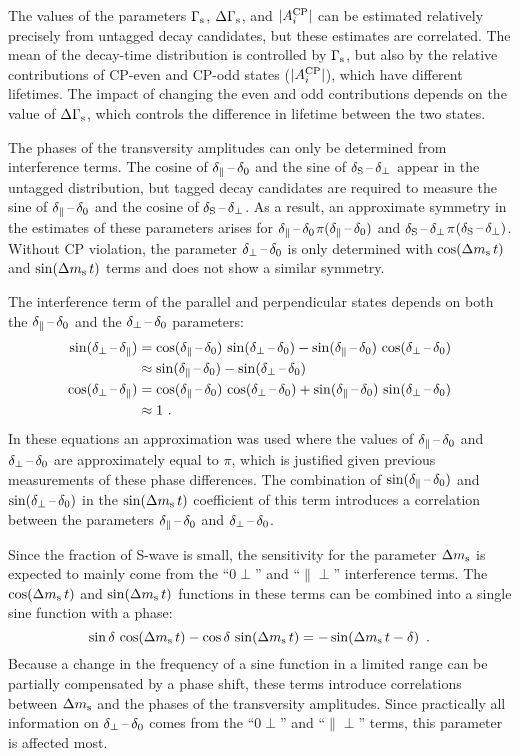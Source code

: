 The values of the parameters $\Gamma_\text{s}$, $\Delta\Gamma_\text{s}$, and $|A_{i}^{\text{CP}}|$ can be estimated relatively precisely from untagged decay candidates, but these
estimates are correlated. The mean of the decay-time distribution is controlled by $\Gamma_\text{s}$, but also by the relative contributions of CP-even
and CP-odd states ($|A_{i}^{\text{CP}}|$), which have different lifetimes. The impact of changing the even and odd contributions depends on the value of
$\Delta\Gamma_\text{s}$, which controls the difference in lifetime between the two states.

The phases of the transversity amplitudes can only be determined from interference terms. The cosine of $\delta_{\parallel}\,\text{--}\,\delta_{0}$ and the sine of
$\delta_{\text{S}}\,\text{--}\,\delta_{\perp}$ appear in the untagged distribution, but tagged decay candidates are required to measure the sine of $\delta_{\parallel}\,\text{--}\,\delta_{0}$ and the
cosine of $\delta_{\text{S}}\,\text{--}\,\delta_{\perp}$. As a result, an approximate symmetry in the estimates of these parameters arises for
$\delta_{\parallel}\,\text{--}\,\delta_{0}$$\pi$\textminus$(\delta_{\parallel}\,\text{--}\,\delta_{0})$ and $\delta_{\text{S}}\,\text{--}\,\delta_{\perp}$\textto$\pi$\textminus$(\delta_{\text{S}}\,\text{--}\,\delta_{\perp})$. Without CP violation, the parameter
$\delta_{\perp}\,\text{--}\,\delta_{0}$ is only determined with $\cos\!\left(\Delta m_\text{s}\, t\right)$ and $\sin\!\left(\Delta m_\text{s}\, t\right)$ terms and does not show a similar symmetry.

The interference term of the parallel and perpendicular states depends on both the $\delta_{\parallel}\,\text{--}\,\delta_{0}$ and the $\delta_{\perp}\,\text{--}\,\delta_{0}$ parameters:
\begin{subequations}
  \label{eq:parperpPhaseExp}
  \begin{align}
    \sin(\delta_{\perp}\,\text{--}\,\delta_{\parallel}) &= \cos(\delta_{\parallel}\,\text{--}\,\delta_{0})\, \sin(\delta_{\perp}\,\text{--}\,\delta_{0}) - \sin(\delta_{\parallel}\,\text{--}\,\delta_{0})\, \cos(\delta_{\perp}\,\text{--}\,\delta_{0}) \nonumber\\
                      &\approx \sin(\delta_{\parallel}\,\text{--}\,\delta_{0}) - \sin(\delta_{\perp}\,\text{--}\,\delta_{0})  \\
    \cos(\delta_{\perp}\,\text{--}\,\delta_{\parallel}) &= \cos(\delta_{\parallel}\,\text{--}\,\delta_{0})\, \cos(\delta_{\perp}\,\text{--}\,\delta_{0}) + \sin(\delta_{\parallel}\,\text{--}\,\delta_{0})\, \sin(\delta_{\perp}\,\text{--}\,\delta_{0}) \nonumber\\
                      &\approx 1 \ .
  \end{align}
\end{subequations}
In these equations an approximation was used where the values of $\delta_{\parallel}\,\text{--}\,\delta_{0}$ and $\delta_{\perp}\,\text{--}\,\delta_{0}$ are approximately equal to $\pi$, which
is justified given previous measurements of these phase differences. The combination of $\sin(\delta_{\parallel}\,\text{--}\,\delta_{0})$ and $\sin(\delta_{\perp}\,\text{--}\,\delta_{0})$ in
the $\sin\!\left(\Delta m_\text{s}\, t\right)$ coefficient of this term introduces a correlation between the parameters $\delta_{\parallel}\,\text{--}\,\delta_{0}$ and $\delta_{\perp}\,\text{--}\,\delta_{0}$.

Since the fraction of S-wave is small, the sensitivity for the parameter $\Delta m_\text{s}$ is expected to mainly come from the ``0$\perp$'' and
``$\parallel\perp$'' interference terms. The $\cos\!\left(\Delta m_\text{s}\, t\right)$ and $\sin\!\left(\Delta m_\text{s}\, t\right)$ functions in these terms can be combined into a single sine function with
a phase:
\begin{equation}
  \sin\delta\, \cos\!\left(\Delta m_\text{s}\, t\right) - \cos\delta\, \sin\!\left(\Delta m_\text{s}\, t\right) = -\sin\!\left(\Delta m_\text{s}\,t - \delta \right) \ .
\end{equation}
Because a change in the frequency of a sine function in a limited range can be partially compensated by a phase shift, these terms
introduce correlations between $\Delta m_\text{s}$ and the phases of the transversity amplitudes. Since practically all information on $\delta_{\perp}\,\text{--}\,\delta_{0}$
comes from the ``0$\perp$'' and ``$\parallel\perp$'' terms, this parameter is affected most.

